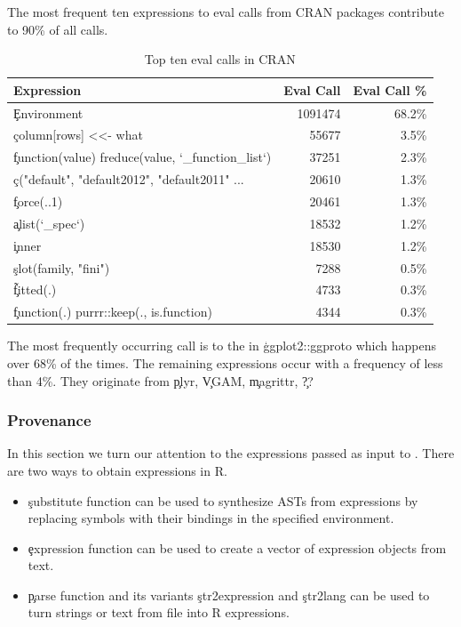 \documentclass[conference]{IEEEtran}
\begin{document}
The most frequent ten expressions to eval calls from CRAN packages contribute to
90\% of all \eval calls.
\begin{table}[tb]
  \centering
  \begin{tabular}{l|rr} \hline
    Expression & Eval Call & Eval Call \% \\\hline
    \c{\<Environment\>} &                                                          1091474  & 68.2\%\\
    \c{column[rows] <<- what} &                                                    55677    & 3.5\%\\
    \c{function(value) freduce(value, `_function_list`)} &                         37251    & 2.3\%\\
    \c{c("default", "default2012", "default2011" ...}&                             20610    & 1.3\%\\
    \c{force(..1)}                                        &                        20461    & 1.3\%\\
    \c{alist(`_spec`)}                                   &                         18532    & 1.2\%\\
    \c{inner}                                           &                          18530    & 1.2\%\\
    \c{slot(family, "fini")}                           &                           7288     & 0.5\%\\
    \c{\~fitted(.)}                                    &                           4733     & 0.3\%\\
    \c{function(.) purrr::keep(., is.function)}      &                             4344     & 0.3\%\\\hline
  \end{tabular}
  \caption{Top ten eval calls in CRAN}
  \label{A}
\end{table}
The most frequently occurring call is to the
\eval in \c{ggplot2::ggproto} which happens over 68\% of the times. The
remaining expressions occur with a frequency of less than 4\%. They originate
from \c{plyr}, \c{VGAM}, \c{magrittr}, \c{??}


\subsubsection{Provenance}

In this section we turn our attention to the \AllExpressionInputEvalCallPerc
expressions passed as input to \eval. There are two ways to obtain
expressions in R.
\begin{itemize}
  \item \c{substitute} function can be used to synthesize ASTs from
  expressions by replacing symbols with their bindings in the specified
  environment.
  \item \c{expression} function can be used to create a vector of expression
    objects from text.
  \item \c{parse} function and its variants \c{str2expression} and \c{str2lang}
    can be used to turn strings or text from file into R expressions.
\end{itemize}
\end{document}
